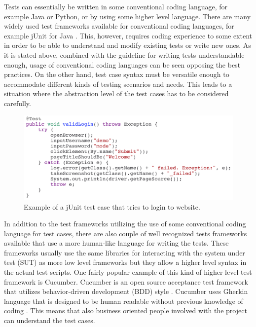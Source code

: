Tests can essentially be written in some conventional coding language, for example Java or Python, or by using some higher level language. There are many widely used test frameworks available for conventional coding languages, for example jUnit for Java \emph{\citep{junit}}. This, however, requires coding experience to some extent in order to be able to understand and modify existing tests or write new ones. As it is stated above, combined with the guideline for writing tests understandable enough, usage of conventional coding languages can be seen opposing the best practices. On the other hand, test case syntax must be versatile enough to accommodate different kinds of testing scenarios and needs. This leads to a situation where the abstraction level of the test cases has to be considered carefully.

\begin{figure}[ht]
  \begin{center}
    \includegraphics[width=13cm]{images/junit_example.png}
    \caption{Example of a jUnit test case that tries to login to website.}
    \label{fig:junit}
  \end{center}
\end{figure}
\FloatBarrier

In addition to the test frameworks utilizing the use of some conventional coding language for test cases, there are also couple of well recognized tests frameworks available that use a more human-like language for writing the tests. These frameworks usually use the same libraries for interacting with the system under test (SUT) as more low level frameworks but they allow a higher level syntax in the actual test scripts. One fairly popular example of this kind of higher level test framework is Cucumber. Cucumber is an open source acceptance test framework that utilizes behavior-driven development (BDD) style \emph{\citep{cucumber}}. Cucumber uses Gherkin language that is designed to be human readable without previous knowledge of coding \emph{\citep{gherkin}}. This means that also business oriented people involved with the project can understand the test cases.

